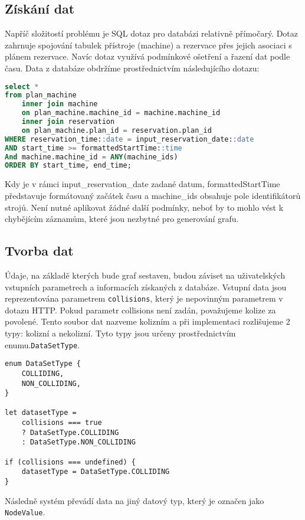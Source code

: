 \subsection{Získání dat}
Napříč složitostí problému je SQL dotaz pro databázi relativně přímočarý. Dotaz zahrnuje spojování tabulek přístroje (machine) a rezervace přes jejich asociaci s plánem rezervace. Navíc dotaz využívá podmínkové ošetření a řazení dat podle času. Data z databáze obdržíme prostřednictvím následujícího dotazu:

\begin{lstlisting}[language=SQL]
select * 
from plan_machine 
    inner join machine 
	on plan_machine.machine_id = machine.machine_id
    inner join reservation
	on plan_machine.plan_id = reservation.plan_id
WHERE reservation_time::date = input_reservation_date::date
AND start_time >= formattedStartTime::time
And machine.machine_id = ANY(machine_ids)
ORDER BY start_time, end_time;
\end{lstlisting}
Kdy je v rámci input\_reservation\_date zadané datum, formattedStartTime představuje formátovaný začátek času a machine\_ids obsahuje pole identifikátorů strojů. Není nutné aplikovat žádné další podmínky, neboť by to mohlo vést k chybějícím záznamům, které jsou nezbytné pro generování grafu.

\subsection{Tvorba dat}
Údaje, na základě kterých bude graf sestaven, budou záviset na uživatelských vstupních parametrech a informacích získaných z databáze. Vstupní data jsou reprezentována parametrem \texttt{collisions}, který je nepovinným parametrem v dotazu HTTP. Pokud parametr collisions není zadán, považujeme kolize za povolené. Tento soubor dat nazveme kolizním a při implementaci rozlišujeme 2 typy: kolizní a nekolizní. Tyto typy jsou určeny prostřednictvím enumu.\texttt{DataSetType}.

\begin{lstlisting}
enum DataSetType {
    COLLIDING,
    NON_COLLIDING,
}

let datasetType =
    collisions === true
	? DataSetType.COLLIDING
	: DataSetType.NON_COLLIDING

if (collisions === undefined) {
    datasetType = DataSetType.COLLIDING
}
\end{lstlisting}

Následně systém převádí data na jiný datový typ, který je označen jako \texttt{NodeValue}.

